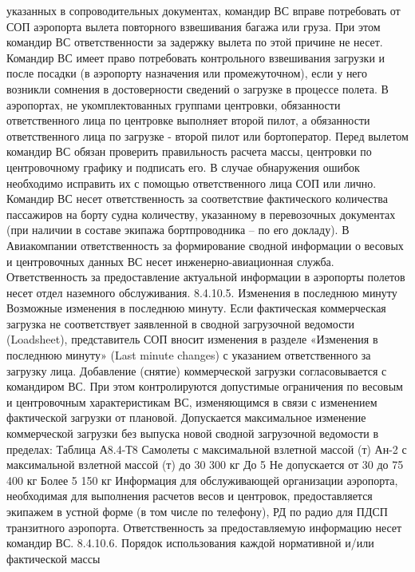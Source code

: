 указанных в сопроводительных документах, командир ВС вправе потребовать от СОП аэропорта вылета повторного взвешивания багажа или груза. При этом командир ВС ответственности за задержку вылета по этой причине не несет. Командир ВС имеет право потребовать контрольного взвешивания загрузки и после посадки (в аэропорту назначения или промежуточном), если у него возникли сомнения в достоверности сведений о загрузке в процессе полета.
В аэропортах, не укомплектованных группами центровки, обязанности ответственного лица по центровке выполняет второй пилот, а обязанности ответственного лица по загрузке - второй пилот или бортоператор.
Перед вылетом командир ВС обязан проверить правильность расчета массы, центровки по центровочному графику и подписать его. В случае обнаружения ошибок необходимо исправить их с помощью ответственного лица СОП или лично.
Командир ВС несет ответственность за соответствие фактического количества пассажиров на борту судна количеству, указанному в перевозочных документах (при наличии в составе экипажа бортпроводника – по его докладу).
В Авиакомпании ответственность за формирование сводной информации о весовых и центровочных данных ВС несет инженерно-авиационная служба. Ответственность за предоставление актуальной информации в аэропорты полетов несет отдел наземного обслуживания.
8.4.10.5. Изменения в последнюю минуту
Возможные изменения в последнюю минуту. Если фактическая коммерческая загрузка не соответствует заявленной в сводной загрузочной ведомости (Loadsheet), представитель СОП вносит изменения в разделе «Изменения в последнюю минуту» (Last minute changes) с указанием ответственного за загрузку лица. Добавление (снятие) коммерческой загрузки согласовывается с командиром ВС. При этом контролируются допустимые ограничения по весовым и центровочным характеристикам ВС, изменяющимся в связи с изменением фактической загрузки от плановой.
Допускается максимальное изменение коммерческой загрузки без выпуска новой сводной загрузочной ведомости в пределах:
                                                                                                                                   Таблица А8.4-Т8
Самолеты с максимальной взлетной массой (т)	Ан-2 с максимальной взлетной массой (т)
до 30	300 кг	До 5	Не допускается
от 30 до 75	400 кг	Более 5	150 кг
Информация для обслуживающей организации аэропорта, необходимая для выполнения расчетов весов и центровок, предоставляется экипажем в устной форме (в том числе по телефону), РД по радио для ПДСП транзитного аэропорта. Ответственность за предоставляемую информацию несет командир ВС. 
8.4.10.6. Порядок использования каждой нормативной и/или фактической массы
